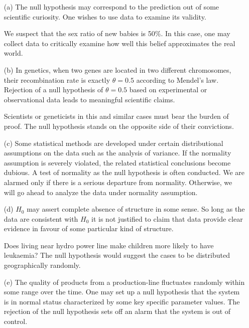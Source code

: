 \begin{itemize}
\item[(a)] 
The null hypothesis may correspond to the prediction out of some
scientific curiosity. One wishes to use data to examine
its validity.

We suspect that the sex ratio of new babies is 50\%.
In this case, one may collect data to critically examine how well
this belief approximates the real world.

\item[(b)] 
In genetics, when two genes are located in two
different chromosomes, their recombination rate is
exactly $\theta = 0.5$ according to Mendel's law.
Rejection of a null hypothesis of $\theta = 0.5$ based
on experimental or observational data leads to
meaningful scientific claims.

Scientists or geneticists in this and similar cases
must bear the burden of proof. The null hypothesis
stands on the opposite side of their convictions.

%

\item[(c)] 
Some statistical methods are developed under certain
distributional assumptions on the data such as the analysis of variance.
If the normality assumption is severely violated, the related statistical
conclusions become dubious. A test of normality as the null
hypothesis is often conducted. 
We are alarmed only if there is a serious departure from normality.
Otherwise, we will go ahead to analyze the data
under normality assumption.

\item[(d)]
$H_0$ may assert complete absence of structure in some sense. 
So long as the data are consistent with $H_0$ it is not
justified to claim that data provide clear evidence in favour of some
particular kind of structure.

Does living near hydro power line make children more likely
to have leukaemia? The null hypothesis would suggest the cases
to be distributed geographically randomly.

\item[(e)]
The quality of products from a production-line fluctuates randomly 
within some range over the time. One may set up a
null hypothesis that the system is in normal status characterized
by some key specific parameter values.
The rejection of the null hypothesis sets off an alarm that the system
is out of control.


\end{itemize}
